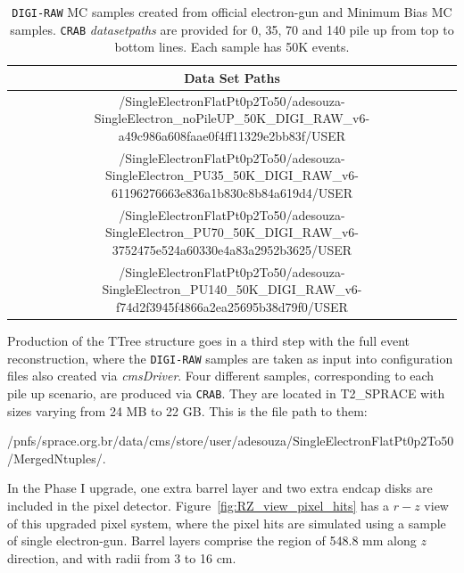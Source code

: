 \begin{table}[!htb]
  \centering
  \scriptsize
  \caption{\texttt{DIGI-RAW} MC samples created from official electron-gun and Minimum Bias MC samples.
    \texttt{CRAB} {\it datasetpaths} are provided for 0, 35, 70 and 140 pile up from top to bottom lines.
    Each sample has 50K events.}
  \label{tab:digi-raw}
  \begin{tabular}{c}
    \hline
        {\bf Data Set Paths} \\ \hline \hline
        /SingleElectronFlatPt0p2To50/adesouza-SingleElectron\_noPileUP\_50K\_DIGI\_RAW\_v6-a49c986a608faae0f4ff11329e2bb83f/USER \\
        /SingleElectronFlatPt0p2To50/adesouza-SingleElectron\_PU35\_50K\_DIGI\_RAW\_v6-61196276663e836a1b830c8b84a619d4/USER \\
        /SingleElectronFlatPt0p2To50/adesouza-SingleElectron\_PU70\_50K\_DIGI\_RAW\_v6-3752475e524a60330e4a83a2952b3625/USER \\
        /SingleElectronFlatPt0p2To50/adesouza-SingleElectron\_PU140\_50K\_DIGI\_RAW\_v6-f74d2f3945f4866a2ea25695b38d79f0/USER \\ \hline
  \end{tabular}
\end{table}

Production of the TTree structure goes in a third step with the full event reconstruction, where the
\texttt{DIGI-RAW} samples are taken as input into configuration files also created via {\it cmsDriver}.
Four different samples, corresponding to each pile up scenario, are produced via \texttt{CRAB}. They are
located in T2\_SPRACE with sizes varying from 24 MB to 22 GB. This is the file path to them:

{\footnotesize /pnfs/sprace.org.br/data/cms/store/user/adesouza/SingleElectronFlatPt0p2To50/MergedNtuples/}.

In the Phase I upgrade, one extra barrel layer and two extra endcap disks are included in the pixel detector.
Figure~\ref{fig:RZ_view_pixel_hits} has a $r-z$ view of this upgraded pixel system, where the pixel hits are
simulated using a sample of single electron-gun. Barrel layers comprise the region of 548.8 mm along $z$ direction,
and with radii from 3 to 16 cm.

